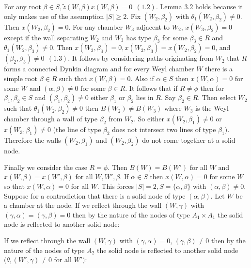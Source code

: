\documentclass{memo-l}
\theoremstyle{definition}
\theoremstyle{remark}
\numberwithin{section}{chapter}
\numberwithin{equation}{chapter}
\begin{document}
   For any root ${\beta}  \in  S, \tilde z (W,{\beta})x(W,{\beta}) = 0\
   \
(1.2)$.  Lemma $3.2$ holds because it only makes use of the assumption
$\vert S\vert \ge 2$.  Fix $(W_{2},{\beta}_{2})$ with
${\theta}_{1}(W_{2},{\beta}_{2})\ne 0$.  Then $x(W_{2},{\beta}_{2}) = 0$.
For any chamber $W_{3}$ adjacent to $W_{2}$, $x(W_{3},{\beta}_{2}) = 0$ except
if the wall separating $W_{2}$ and $W_{3}$ has type ${\beta}_{3}$ for some
${\beta}_{3}  \in  R$ and ${\theta}_{1}(W_{2},{\beta}_{3})\ne 0$.  Then
$x(W_{3},{\beta}_{3}) = 0, x(W_{2},{\beta}_{3}) = x(W_{2},{\beta}_{2}) = 0$, and
$({\beta}_{2},{\beta}_{3})\ne 0 \ \ (1.3)$.  It follows by considering paths
originating from $W_{2}$ that $R$ forms a connected Dynkin diagram and for
every Weyl chamber $W$ there is a simple root ${\beta}  \in  R$ such that
$x(W,{\beta}) = 0$.  Also if ${\alpha}  \in  S$ then $x(W,{\alpha}) = 0$ for
some $W$ and $({\alpha},{\beta})\ne 0$ for some ${\beta}  \in  R$.  It
follows that if $R\ne {\phi}$ then for ${\beta}_{1},{\beta}_{2}  \in  S$
and $({\beta}_{1},{\beta}_{2})\ne 0$ either ${\beta}_{1}$ or ${\beta}_{2}$
lies in $R$.  Say ${\beta}_{2}  \in  R$.  Then select $W_{2}$ such that
${\theta}_{1}(W_{2},{\beta}_{2})\ne 0$ then $B(W_{2})\ne B(W_{3})$ where
$W_{3}$ is the Weyl chamber through a wall of type ${\beta}_{2}$ from
$W_{2}$.  So either $x(W_{2},{\beta}_{1})\ne 0$ or $x(W_{3},{\beta}_{1})\ne
0$ (the line of type ${\beta}_{2}$ does not intersect two lines of type
${\beta}_{1})$.  Therefore the walls $(W_{2},{\beta}_{1})$ and
$(W_{2},{\beta}_{2})$ do not come together at a solid node.

   Finally we consider the case $R={\phi}$.  Then $B(W) = B(W')$ for all $W$
and $x(W,{\beta})=x(W',{\beta})$ for all $W,W',{\beta}$.  If ${\alpha}
 \in  S$ then $x(W,{\alpha})=0$ for some $W$ so that $x(W,{\alpha})=0$ for
all $W$.  This forces $\vert S\vert =2, S=\{{\alpha},{\beta}\}$ with
$({\alpha},{\beta})\ne 0$.  Suppose for a contradiction that there is a
solid node of type $({\alpha},{\beta})$.  Let $W$ be a chamber at the node.
If we reflect through the wall $(W,{\gamma})$ with
$({\gamma},{\alpha})=({\gamma},{\beta})=0$ then by the nature of the nodes
of type $A_{1}\times A_{1}$ the solid node is reflected to another solid node:

\medskip
\medskip

\noindent
If we reflect through the wall $(W,{\gamma})$ with $({\gamma},{\alpha}) = 0$,
$({\gamma},{\beta})\ne 0$ then by the nature of the nodes of type $A_{2}$
the solid node is reflected to another solid node
$({\theta}_{1}(W',{\gamma})\ne 0$ for all $W')$:
\end{document}
